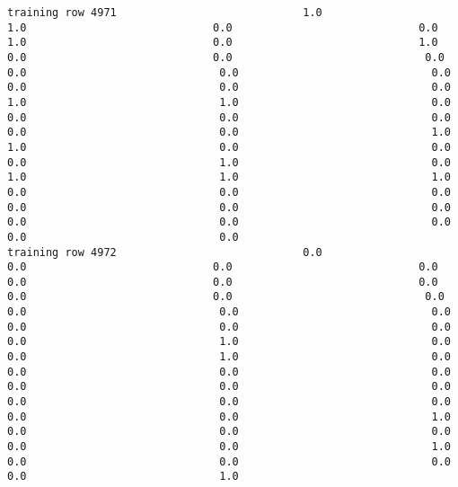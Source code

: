 \documentclass[11pt]{article}
\begin{document}
\begin{verbatim}
training row 4971                             1.0                             1.0                             0.0                             0.0                             1.0                             0.0                             1.0                             0.0                             0.0                              0.0                              0.0                              0.0                              0.0                              0.0                              0.0                              0.0                              1.0                              1.0                              0.0                              0.0                              0.0                              0.0                              0.0                              0.0                              1.0                              1.0                              0.0                              0.0                              0.0                              1.0                              0.0                              1.0                              1.0                              1.0                              0.0                              0.0                              0.0                              0.0                              0.0                              0.0                              0.0                              0.0                              0.0                              0.0                              0.0
training row 4972                             0.0                             0.0                             0.0                             0.0                             0.0                             0.0                             0.0                             0.0                             0.0                              0.0                              0.0                              0.0                              0.0                              0.0                              0.0                              0.0                              0.0                              1.0                              0.0                              0.0                              1.0                              0.0                              0.0                              0.0                              0.0                              0.0                              0.0                              0.0                              0.0                              0.0                              0.0                              0.0                              0.0                              1.0                              0.0                              0.0                              0.0                              0.0                              0.0                              1.0                              0.0                              0.0                              0.0                              0.0                              1.0

\end{verbatim}
\end{document}
